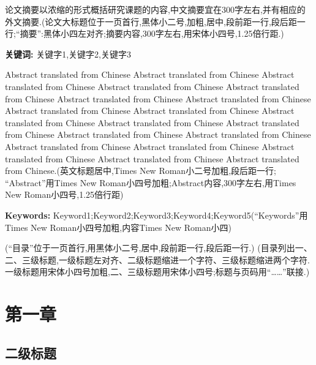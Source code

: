 \thispagestyle{empty} %

\begin{cnabstract}
	论文摘要以浓缩的形式概括研究课题的内容,中文摘要宜在300字左右,并有相应的外文摘要.(论文大标题位于一页首行,黑体小二号,加粗,居中,段前距一行,段后距一行;“摘要”:黑体小四左对齐;摘要内容,300字左右,用宋体小四号,1.25倍行距.)
	\par\noindent\textbf{关键词: } 关键字1,关键字2,关键字3 %
\end{cnabstract}

\par\par
{}

\begin{enabstract}
	Abstract translated from Chinese Abstract translated from Chinese Abstract translated from Chinese Abstract translated from Chinese Abstract translated from Chinese Abstract translated from Chinese Abstract translated from Chinese Abstract translated from Chinese Abstract translated from Chinese Abstract translated from Chinese Abstract translated from Chinese Abstract translated from Chinese Abstract translated from Chinese Abstract translated from Chinese Abstract translated from Chinese Abstract translated from Chinese Abstract translated from Chinese Abstract translated from Chinese Abstract translated from Chinese.(英文标题居中,Times New Roman小二号加粗,段后距一行; “Abstract”用Times New Roman小四号加粗;Abstract内容,300字左右,用Times New Roman小四号,1.25倍行距)
	\par\noindent\textbf{Keywords:} Keyword1;Keyword2;Keyword3;Keyword4;Keyword5(“Keywords”用Times New Roman小四号加粗,内容Times New Roman小四)
\end{enabstract}
\newpage
\setcounter{page}{1}
\tableofcontents

\newpage
(“目录”位于一页首行,用黑体小二号,居中,段前距一行,段后距一行.)
(目录列出一、二、三级标题,一级标题左对齐、二级标题缩进一个字符、三级标题缩进两个字符.一级标题用宋体小四号加粗,二、三级标题用宋体小四号;标题与页码用“……”联接.)

\section{第一章}
\subsection{二级标题}
